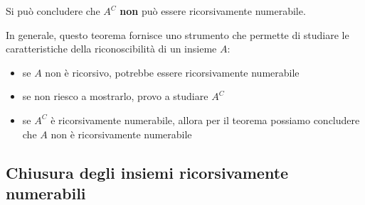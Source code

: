 Si può concludere che $A^C$ \textbf{non} può essere ricorsivamente numerabile.

In generale, questo teorema fornisce uno strumento che permette di studiare le caratteristiche della riconoscibilità di un insieme $A$:
\begin{itemize}
	\item se $A$ non è ricorsivo, potrebbe essere ricorsivamente numerabile
	\item se non riesco a mostrarlo, provo a studiare $A^C$
	\item se $A^C$ è ricorsivamente numerabile, allora per il teorema possiamo concludere che $A$ non è ricorsivamente numerabile
\end{itemize}

\subsection{Chiusura degli insiemi ricorsivamente numerabili}

